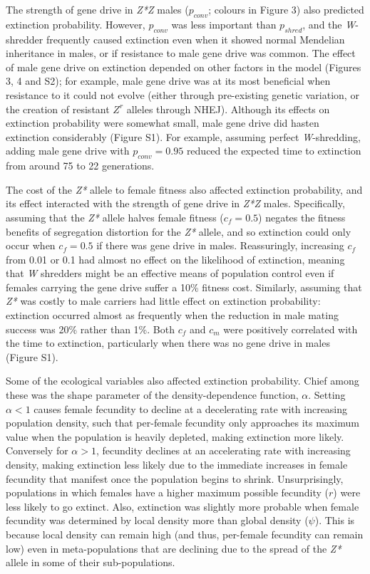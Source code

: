 \documentclass[]{rsos}%
\begin{document}
The strength of gene drive in \emph{Z*Z} males (\(p_{conv}\); colours in
Figure 3) also predicted extinction probability. However, \(p_{conv}\)
was less important than \(p_{shred}\), and the \emph{W}-shredder
frequently caused extinction even when it showed normal Mendelian
inheritance in males, or if resistance to male gene drive was common.
The effect of male gene drive on extinction depended on other factors in
the model (Figures 3, 4 and S2); for example, male gene drive was at its
most beneficial when resistance to it could not evolve (either through
pre-existing genetic variation, or the creation of resistant \(Z^r\)
alleles through NHEJ). Although its effects on extinction probability
were somewhat small, male gene drive did hasten extinction considerably
(Figure S1). For example, assuming perfect \emph{W}-shredding, adding
male gene drive with \(p_{conv} = 0.95\) reduced the expected time to
extinction from around 75 to 22 generations.

The cost of the \emph{Z*} allele to female fitness also affected
extinction probability, and its effect interacted with the strength of
gene drive in \emph{Z*Z} males. Specifically, assuming that the
\emph{Z*} allele halves female fitness (\(c_f = 0.5\)) negates the
fitness benefits of segregation distortion for the \emph{Z*} allele, and
so extinction could only occur when \(c_f = 0.5\) if there was gene
drive in males. Reassuringly, increasing \(c_f\) from 0.01 or 0.1 had
almost no effect on the likelihood of extinction, meaning that \emph{W}
shredders might be an effective means of population control even if
females carrying the gene drive suffer a 10\% fitness cost. Similarly,
assuming that \emph{Z*} was costly to male carriers had little effect on
extinction probability: extinction occurred almost as frequently when
the reduction in male mating success was 20\% rather than 1\%. Both
\(c_f\) and \(c_m\) were positively correlated with the time to
extinction, particularly when there was no gene drive in males (Figure
S1).

Some of the ecological variables also affected extinction probability.
Chief among these was the shape parameter of the density-dependence
function, \(\alpha\). Setting \(\alpha < 1\) causes female fecundity to
decline at a decelerating rate with increasing population density, such
that per-female fecundity only approaches its maximum value when the
population is heavily depleted, making extinction more likely.
Conversely for \(\alpha > 1\), fecundity declines at an accelerating
rate with increasing density, making extinction less likely due to the
immediate increases in female fecundity that manifest once the
population begins to shrink. Unsurprisingly, populations in which
females have a higher maximum possible fecundity (\(r\)) were less
likely to go extinct. Also, extinction was slightly more probable when
female fecundity was determined by local density more than global
density (\(\psi\)). This is because local density can remain high (and
thus, per-female fecundity can remain low) even in meta-populations that
are declining due to the spread of the \emph{Z*} allele in some of their
sub-populations.
\end{document}
